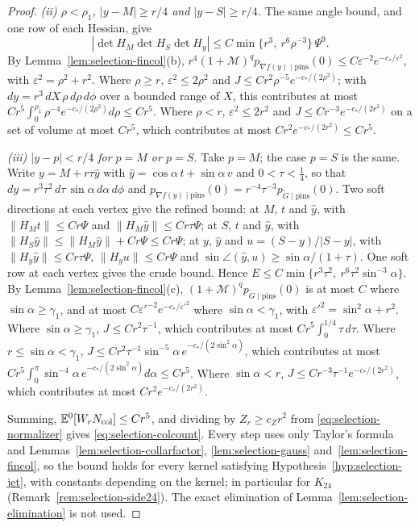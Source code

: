\begin{proof}
\emph{(ii) $\rho<\rho_1$, $|y-M|\ge r/4$ and $|y-S|\ge r/4$.} The same angle bound, and one row of each Hessian, give
\begin{equation}\label{eq:selection-colprod}
|\det H_M\det H_S\det H_y|\le C\min\{r^3,\ r^6\rho^{-3}\}\,\Psi^9 .
\end{equation}
By Lemma~\ref{lem:selection-fincol}(b), $r^4(1+\mathcal M)^qp_{\nabla f(y)\mid\text{pins}}(0)\le C\varepsilon^{-2}e^{-c_*/\varepsilon^2}$, with $\varepsilon^2=\rho^2+r^2$. Where $\rho\ge r$, $\varepsilon^2\le2\rho^2$ and $J\le Cr^2\rho^{-5}e^{-c_*/(2\rho^2)}$; with $dy=r^3\,dX\,\rho\,d\rho\,d\phi$ over a bounded range of $X$, this contributes at most $Cr^5\int_0^{\rho_1}\rho^{-4}e^{-c_*/(2\rho^2)}d\rho\le Cr^5$. Where $\rho<r$, $\varepsilon^2\le2r^2$ and $J\le Cr^{-3}e^{-c_*/(2r^2)}$ on a set of volume at most $Cr^5$, which contributes at most $Cr^2e^{-c_*/(2r^2)}\le Cr^5$.

\emph{(iii) $|y-p|<r/4$ for $p=M$ or $p=S$.} Take $p=M$; the case $p=S$ is the same. Write $y=M+r\tau\hat y$ with $\hat y=\cos\alpha\,t+\sin\alpha\,v$ and $0<\tau<\frac14$, so that $dy=r^3\tau^2\,d\tau\,\sin\alpha\,d\alpha\,d\phi$ and $p_{\nabla f(y)\mid\text{pins}}(0)=r^{-4}\tau^{-3}p_{\tilde G\mid\text{pins}}(0)$. Two soft directions at each vertex give the refined bound: at $M$, $t$ and $\hat y$, with $\|H_Mt\|\le Cr\Psi$ and $\|H_M\hat y\|\le Cr\tau\Psi$; at $S$, $t$ and $\hat y$, with $\|H_S\hat y\|\le\|H_M\hat y\|+Cr\Psi\le Cr\Psi$; at $y$, $\hat y$ and $u=(S-y)/|S-y|$, with $\|H_y\hat y\|\le Cr\tau\Psi$, $\|H_yu\|\le Cr\Psi$ and $\sin\angle(\hat y,u)\ge\sin\alpha/(1+\tau)$. One soft row at each vertex gives the crude bound. Hence $E\le C\min\{r^3\tau^2,\ r^6\tau^2\sin^{-3}\alpha\}$. By Lemma~\ref{lem:selection-fincol}(c), $(1+\mathcal M)^qp_{\tilde G\mid\text{pins}}(0)$ is at most $C$ where $\sin\alpha\ge\gamma_1$, and at most $C\varepsilon'^{-2}e^{-c_*/\varepsilon'^2}$ where $\sin\alpha<\gamma_1$, with $\varepsilon'^2=\sin^2\alpha+r^2$. Where $\sin\alpha\ge\gamma_1$, $J\le Cr^2\tau^{-1}$, which contributes at most $Cr^5\int_0^{1/4}\tau\,d\tau$. Where $r\le\sin\alpha<\gamma_1$, $J\le Cr^2\tau^{-1}\sin^{-5}\alpha\,e^{-c_*/(2\sin^2\alpha)}$, which contributes at most $Cr^5\int_0^\pi\sin^{-4}\alpha\,e^{-c_*/(2\sin^2\alpha)}d\alpha\le Cr^5$. Where $\sin\alpha<r$, $J\le Cr^{-3}\tau^{-1}e^{-c_*/(2r^2)}$, which contributes at most $Cr^2e^{-c_*/(2r^2)}$.

Summing, $\mathbb E^0[W_rN_{\rm col}]\le Cr^5$, and dividing by $Z_r\ge c_Zr^2$ from \eqref{eq:selection-normalizer} gives \eqref{eq:selection-colcount}. Every step uses only Taylor's formula and Lemmas~\ref{lem:selection-collarfactor}, \ref{lem:selection-gauss} and~\ref{lem:selection-fincol}, so the bound holds for every kernel satisfying Hypothesis~\ref{hyp:selection-jet}, with constants depending on the kernel; in particular for $K_{24}$ (Remark~\ref{rem:selection-side24}). The exact elimination of Lemma~\ref{lem:selection-elimination} is not used.
\end{proof}

